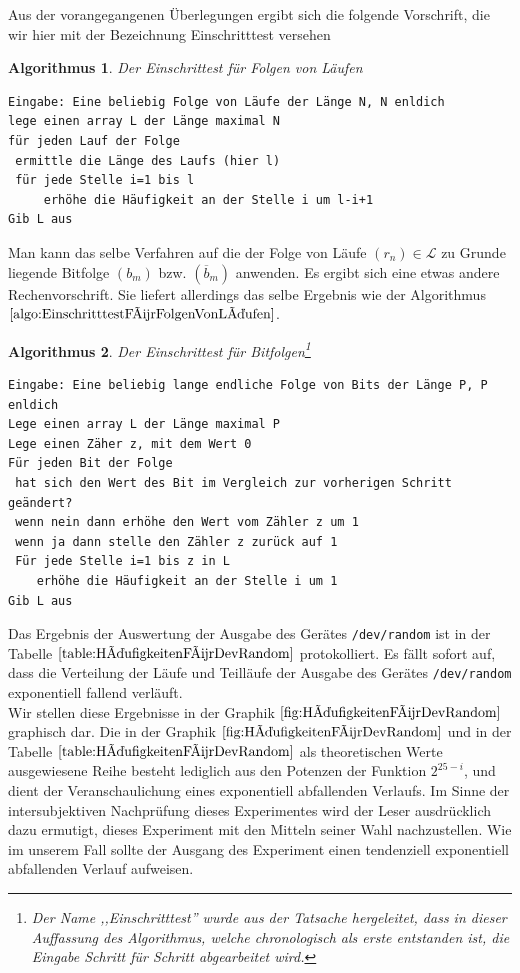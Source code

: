 \documentclass[11pt,oneside,a4paper]{scrreprt}
\newtheorem{algorithmus}{Algorithmus}
\begin{document}
\noindent Aus der vorangegangenen Überlegungen ergibt sich die folgende Vorschrift, die wir hier mit der Bezeichnung Einschritttest versehen
\begin{algorithmus}\label{algo:EinschritttestFürFolgenVonLäufen}
Der Einschrittest für Folgen von Läufen
\begin{lstlisting}
Eingabe: Eine beliebig Folge von Läufe der Länge N, N enldich
lege einen array L der Länge maximal N
für jeden Lauf der Folge
 ermittle die Länge des Laufs (hier l)
 für jede Stelle i=1 bis l
     erhöhe die Häufigkeit an der Stelle i um l-i+1
Gib L aus
\end{lstlisting}
\end{algorithmus}
\noindent Man kann das selbe Verfahren auf die der Folge von Läufe $(r_n)\in\mathcal L$ zu Grunde liegende Bitfolge $(b_m)$ bzw. $(\overline b_m)$ anwenden. Es ergibt sich eine etwas andere Rechenvorschrift. Sie liefert allerdings das selbe Ergebnis wie der Algorithmus $\ref{algo:EinschritttestFürFolgenVonLäufen}$.
\begin{algorithmus}\label{algo:EinschritttestFürBitfolge}
Der Einschrittest für Bitfolgen\footnote{Der Name ,,Einschritttest'' wurde aus der Tatsache hergeleitet, dass in dieser Auffassung des Algorithmus, welche chronologisch als erste entstanden ist, die Eingabe Schritt für Schritt abgearbeitet wird.}
\begin{lstlisting}
Eingabe: Eine beliebig lange endliche Folge von Bits der Länge P, P enldich 
Lege einen array L der Länge maximal P
Lege einen Zäher z, mit dem Wert 0
Für jeden Bit der Folge
 hat sich den Wert des Bit im Vergleich zur vorherigen Schritt geändert?
 wenn nein dann erhöhe den Wert vom Zähler z um 1
 wenn ja dann stelle den Zähler z zurück auf 1
 Für jede Stelle i=1 bis z in L
    erhöhe die Häufigkeit an der Stelle i um 1 
Gib L aus
\end{lstlisting}
\end{algorithmus}

Das Ergebnis der Auswertung der Ausgabe des Gerätes {\tt /dev/random} ist in der Tabelle $\ref{table:HäufigkeitenFürDevRandom}$ protokolliert. Es fällt sofort auf, dass die Verteilung der Läufe und Teilläufe der Ausgabe des Gerätes {\tt /dev/random} exponentiell fallend verläuft. \\
Wir stellen diese Ergebnisse in der Graphik $\ref{fig:HäufigkeitenFürDevRandom}$ graphisch dar. Die in der Graphik $\ref{fig:HäufigkeitenFürDevRandom}$ und in der Tabelle $\ref{table:HäufigkeitenFürDevRandom}$ als theoretischen Werte ausgewiesene Reihe besteht lediglich aus den Potenzen der Funktion $2^{25-i}$, und dient der Veranschaulichung eines exponentiell abfallenden Verlaufs. Im Sinne der intersubjektiven Nachprüfung dieses Experimentes wird der Leser ausdrücklich dazu ermutigt, dieses Experiment mit den Mitteln seiner Wahl nachzustellen. Wie im unserem Fall sollte der Ausgang des Experiment einen tendenziell exponentiell abfallenden Verlauf aufweisen.\\
\end{document}
